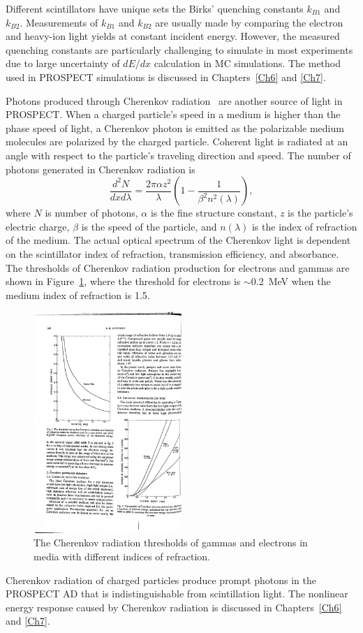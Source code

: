 Different scintillators have unique sets the Birks' quenching constants $k_{B1}$ and $k_{B2}$.
Measurements of $k_{B1}$ and $k_{B2}$ are usually made by comparing the electron and heavy-ion light yields at constant incident energy.
However, the measured quenching constants are particularly challenging to simulate in most experiments due to large uncertainty of $dE/dx$ calculation in MC simulations.
The method used in PROSPECT simulations is discussed in Chapters~\ref{Ch6} and \ref{Ch7}.

Photons produced through Cherenkov radiation~\cite{bib:ckov} are another source of light in PROSPECT.
When a charged particle's speed in a medium is higher than the phase speed of light, a Cherenkov photon is emitted as the polarizable medium molecules are polarized by the charged particle.
Coherent light is radiated at an angle with respect to the particle's traveling direction and speed.
The number of photons generated in Cherenkov radiation is 
\begin{equation}
    \frac{d^2N}{dxd\lambda} = \frac{2\pi\alpha z^2}{\lambda}\left(1- \frac{1}{\beta^2n^2(\lambda)}\right),
\end{equation}
where $N$ is number of photons, $\alpha$ is the fine structure constant, $z$ is the particle's electric charge, $\beta$ is the speed of the particle, and $n(\lambda)$ is the index of refraction of the medium.
The actual optical spectrum of the Cherenkov light is dependent on the scintillator index of refraction, transmission efficiency, and absorbance.
The thresholds of Cherenkov radiation production for electrons and gammas are shown in Figure~\ref{fig:ckovthresh}, where the threshold for electrons is $\sim$0.2~MeV when the medium index of refraction is 1.5.

\begin{figure}[h!]
    \centering
    \includegraphics[width=0.5\textwidth]{Figures/CkovThresh.pdf}
	\caption[Cherenkov radiation thresholds]{
    The Cherenkov radiation thresholds of gammas and electrons in media with different indices of refraction.}
    \label{fig:ckovthresh}
\end{figure}

Cherenkov radiation of charged particles produce prompt photons in the PROSPECT AD that is indistinguishable from scintillation light.
The nonlinear energy response caused by Cherenkov radiation is discussed in Chapters~\ref{Ch6} and \ref{Ch7}.
